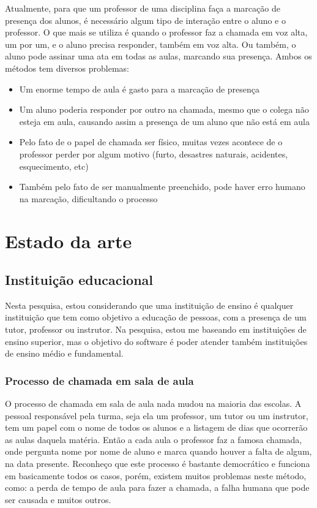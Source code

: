 \documentclass[
	12pt,
	oneside,
	a4paper,
	english,
	brazil,
]{abntex2}
\begin{document}
Atualmente, para que um professor de uma disciplina faça a marcação de presença dos alunos, é necessário algum tipo de interação entre o aluno e o professor. O que mais se utiliza é quando o professor faz a chamada em voz alta, um por um, e o aluno precisa responder, também em voz alta. Ou também, o aluno pode assinar uma ata em todas as aulas, marcando sua presença. Ambos os métodos tem diversos problemas:

\begin{itemize}
    \item Um enorme tempo de aula é gasto para a marcação de presença
    \item Um aluno poderia responder por outro na chamada, mesmo que o colega não esteja em aula, causando assim a presença de um aluno que não está em aula
    \item Pelo fato de o papel de chamada ser físico, muitas vezes acontece de o professor perder por algum motivo (furto, desastres naturais, acidentes, esquecimento, etc)
    \item Também pelo fato de ser manualmente preenchido, pode haver erro humano na marcação, dificultando o processo
\end{itemize}



\chapter{Estado da arte}

\section{Instituição educacional}

Nesta pesquisa, estou considerando que uma instituição de ensino é qualquer instituição que tem como objetivo a educação de pessoas, com a presença de um tutor, professor ou instrutor. Na pesquisa, estou me baseando em instituições de ensino superior, mas o objetivo do software é poder atender também instituições de ensino médio e fundamental.

\subsection{Processo de chamada em sala de aula}

O processo de chamada em sala de aula nada mudou na maioria das escolas. A pessoal responsável pela turma, seja ela um professor, um tutor ou um instrutor, tem um papel com o nome de todos os alunos e a listagem de dias que ocorrerão as aulas daquela matéria. Então a cada aula o professor faz a famosa chamada, onde pergunta nome por nome de aluno e marca quando houver a falta de algum, na data presente. Reconheço que este processo é bastante democrático e funciona em basicamente todos os casos, porém, existem muitos problemas neste método, como: a perda de tempo de aula para fazer a chamada, a falha humana que pode ser causada e muitos outros.
\end{document}
